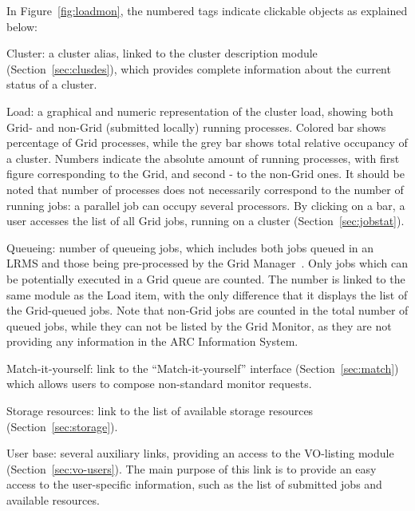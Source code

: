 \documentclass{article}
\begin{document}
In Figure~\ref{fig:loadmon}, the numbered tags indicate clickable
objects as explained below:
\begin{list}{)}{ \itemsep=-0.5mm}
\item \textsf{Cluster}: a cluster alias,  linked
  to the cluster description module (Section~\ref{sec:clusdes}), which
  provides complete information about the current status of a cluster.
\item \textsf{Load}: a graphical and numeric representation of the
  cluster load,  showing both Grid- and non-Grid
  (submitted locally) running processes. Colored bar shows percentage of
  Grid processes, while the grey bar shows total relative
  occupancy of a cluster. Numbers indicate the absolute amount of
  running processes, with first figure corresponding to the Grid, and
  second - to the non-Grid ones. It should be noted that number of
  processes does not necessarily correspond to the number of running
  jobs: a parallel job  can occupy several
  processors. By clicking on a bar, a user accesses the list of all
  Grid jobs,  running on a cluster
  (Section~\ref{sec:jobstat}).
\item \textsf{Queueing}: number of queueing jobs, 
  which includes both jobs queued in an LRMS and those being
  pre-processed by the Grid Manager~\cite{gm}. Only jobs which can be
  potentially executed in a Grid queue are counted. The number is
  linked to the same module as the \textsf{Load} item, with the only
  difference that it displays the list of the Grid-queued jobs. Note
  that non-Grid jobs are counted in the total number of queued jobs,
  while they can not be listed by the Grid Monitor, as they are not
  providing any information in the ARC Information System.
\item \textsf{Match-it-yourself}: link to the ``Match-it-yourself''
  interface (Section~\ref{sec:match}) which allows users to compose
  non-standard monitor requests. 
\item \textsf{Storage resources}: link to the list of available
  storage resources (Section~\ref{sec:storage}). 
\item \textsf{User base}: several auxiliary links, providing an access
  to the VO-listing module (Section~\ref{sec:vo-users}). The main
  purpose of this link is to provide an easy access to the
  user-specific information, such as the list of submitted jobs and
  available resources.
\end{list}
\end{document}
